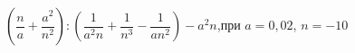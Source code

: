 \begin{ex}[type=simplify_calculate]
	\begin{condition}
		\( \left( \dfrac{n}{a}+\dfrac{a^2}{n^2} \right):\left( \dfrac{1}{a^2n}+\dfrac{1}{n^3}-\dfrac{1}{an^2} \right)-a^2n \),\quad при \( a=0,02 \), \( n=-10 \)
	\end{condition}
\end{ex}